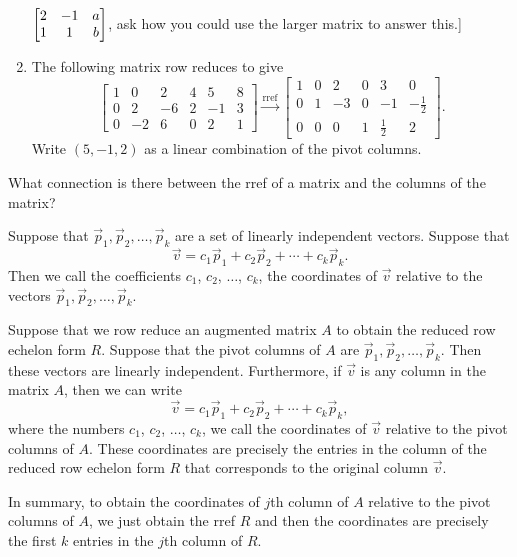 \begin{problem}
\begin{enumerate}
$\begin{bmatrix}
\begin{matrix} 2\\1 \end{matrix}&
\begin{matrix} -1\\1 \end{matrix}&
\begin{matrix} a\\b \end{matrix}
\end{bmatrix}
$, ask how you could use the larger matrix to answer this.]
\item The following matrix row reduces to give
$$\begin{bmatrix}
1 & 0 & 2 & 4 & 5 & 8 \\
0 & 2 & -6 & 2 & -1 & 3 \\
0 & -2 & 6 & 0 & 2 & 1
\end{bmatrix}
\xrightarrow{\text{rref}}
\begin{bmatrix}
1 & 0 & 2 & 0 & 3 & 0 \\
0 & 1 & -3 & 0 & -1 & -\frac{1}{2} \\
0 & 0 & 0 & 1 & \frac{1}{2} & 2
\end{bmatrix}
.$$
Write $(5,-1,2)$ as a linear combination of the pivot columns.
\end{enumerate}
 
\end{problem}

\begin{question}
 What connection is there between the rref of a matrix and the columns of the matrix?
\end{question}

\begin{definition}
Suppose that $\vec p_1,\vec p_2,\ldots,\vec p_k$ are a set of linearly independent vectors. Suppose that 
$$\vec v = c_1\vec p_1+c_2\vec p_2+\cdots+c_k\vec p_k.$$
Then we call the coefficients $c_1$, $c_2$, $\ldots$, $c_k$, the coordinates of $\vec v$ relative to the vectors $\vec p_1,\vec p_2,\ldots,\vec p_k$.
\end{definition}
\begin{theorem}
Suppose that we row reduce an augmented matrix $A$ to obtain the reduced row echelon form $R$. 
Suppose that the pivot columns of $A$ are $\vec p_1,\vec p_2,\ldots,\vec p_k$. Then these vectors are linearly independent.  Furthermore, if $\vec v$ is any column in the matrix $A$, then we can write 
$$\vec v = c_1\vec p_1+c_2\vec p_2+\cdots+c_k\vec p_k,$$
where the numbers $c_1$, $c_2$, $\ldots$, $c_k$, we call the coordinates of $\vec v$ relative to the pivot columns of $A$.  These coordinates are precisely the entries in the column of the reduced row echelon form $R$ that corresponds to the original column $\vec v$. 

In summary, to obtain the coordinates of $j$th column of $A$ relative to the pivot columns of $A$, we just obtain the rref $R$ and then the coordinates are precisely the first $k$ entries in the $j$th column of $R$.  
\end{theorem}


